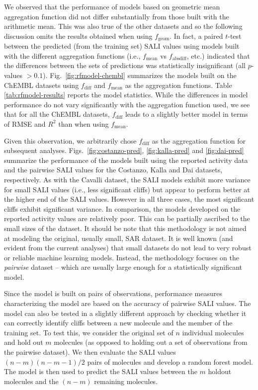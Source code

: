 \documentclass[letterpaper, 12pt]{article}
\begin{document}
We observed that the performance of models based on geometric mean aggregation function did not
differ substantially from those built with the arithmetic mean. This was also true of the other
datasets and so the following discussion omits the results obtained when using
$f_{\textrm{geom}}$. In fact, a paired $t$-test between the predicted (from the training set) SALI
values using models built with the different aggregation functions (i.e., $f_{\textrm{mean}}$ vs
$f_{\textrm{absdiff}}$, etc.)  indicated that the differences between the sets of predictions was
statistically insignificant (all $p$-values $> 0.1$). Fig.~\ref{fig:rfmodel-chembl} summarizes the
models built on the ChEMBL datasets using $f_{\textrm{diff}}$ and $f_{\textrm{mean}}$ as the
aggregation functions. Table \ref{tab:rfmodel-results} reports the model statistics.  While the
differences in model performance do not vary significantly with the aggregation function used, we
see that for all the ChEMBL datasets, $f_{\textrm{diff}}$ leads to a slightly better model
in terms of RMSE and $R^2$ than when using $f_{\textrm{mean}}$.

Given this observation, we arbitrarily chose $f_{\textrm{diff}}$ as the aggregation function
for subsequent analyses. Figs.~\ref{fig:costanzo-pred}, \ref{fig:kalla-pred} and \ref{fig:dai-pred}
summarize the performance of the models built using the reported activity data and the pairwise SALI
values for the Costanzo, Kalla and Dai datasets, respectively. As with the Cavalli dataset, the SALI
models exhibit more variance for small SALI values (i.e., less significant cliffs) but appear to
perform better at the higher end of the SALI values. However in all three cases, the most
significant cliffs exhibit significant variance. In comparison, the models developed on the reported
activity values are relatively poor. This can be partially ascribed to the small sizes of the
dataset. It should be note that this methodology is not aimed at modeling the original, usually
small, SAR dataset. It is well known (and evident from the current analyses) that small datasets do
not lead to very robust or reliable machine learning models. Instead, the methodology focuses on the
\emph{pairwise} dataset -- which are usually large enough for a statistically significant model.

Since the model is built on pairs of observations, performance measures characterizing the model are
based on the accuracy of pairwise SALI values. The model can also be tested in a slightly different
approach by checking whether it can correctly identify cliffs between a new molecule and the member
of the training set. To test this, we consider the original set of $n$ individual molecules and hold out
$m$ molecules (as opposed to holding out a set of observations from the pairwise dataset). We then
evaluate the SALI values $(n-m)(n-m-1)/2$ pairs of molecules and develop a random forest model. The
model is then used to predict the SALI values between the $m$ holdout molecules and the $(n-m)$
remaining molecules. 
\end{document}
